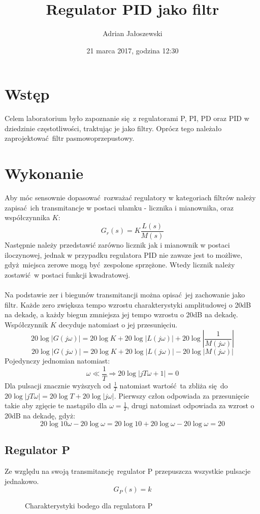 \documentclass[a4paper, 10pt]{article}
\title{Regulator PID jako filtr}
\author{Adrian Jałoszewski}
\date{21 marca 2017, godzina 12:30}
\begin{document}
	\lstset{language=Python, basicstyle=\footnotesize,
		keepspaces=true,frame=single,tabsize=4}
	\maketitle
	\section{Wstęp}
		Celem laboratorium było zapoznanie się z regulatorami P, PI, PD oraz PID w dziedzinie częstotliwości, traktując je jako filtry. Oprócz tego należało zaprojektować filtr pasmowoprzepustowy.
	\section{Wykonanie}
		Aby móc sensownie dopasować rozważać regulatory w kategoriach filtrów należy zapisać ich transmitancje w postaci ułamku - licznika i mianownika, oraz współczynnika $K$:
		$$
			G_r(s) = K\frac{L(s)}{M(s)}
		$$
		Następnie należy przedstawić zarówno licznik jak i mianownik w postaci iloczynowej, jednak w przypadku regulatora PID nie zawsze jest to możliwe, gdyż miejsca zerowe mogą być zespolone sprzężone. Wtedy licznik należy zostawić w postaci funkcji kwadratowej. 
		\\
		\\
		Na podstawie zer i biegunów transmitancji można opisać jej zachowanie jako filtr. Każde zero zwiększa tempo wzrostu charakterystyki amplitudowej o 20dB na dekadę, a każdy biegun zmniejsza jej tempo wzrostu o 20dB na dekadę. Współczynnik $K$ decyduje natomiast o jej przesunięciu.
		$$
			20 \log |G(j\omega)| = 20 \log K + 20 \log |L(j\omega)| + 20 \log \left|\frac{1}{M(j\omega)}\right|
		$$
		$$
			20 \log |G(j\omega)| =  20 \log K + 20 \log |L(j\omega)| - 20 \log \left|M(j\omega)\right|
		$$ 
		Pojedynczy jednomian natomiast:
		$$
			\omega \ll \frac{1}{T} \Rightarrow 20 \log |jT\omega + 1| = 0 
		$$
		Dla pulsacji znacznie wyższych od $\frac{1}{T}$ natomiast wartość ta zbliża się do \linebreak $20 \log |jT\omega| = 20\log T + 20 \log |j\omega|$. Pierwszy człon odpowiada za przesunięcie takie aby zgięcie te nastąpiło dla $\omega = \frac{1}{T}$, drugi natomiast odpowiada za wzrost o 20dB na dekadę, gdyż: 
		$$
			20\log 10\omega - 20\log \omega = 20 \log 10 + 20 \log \omega - 20 \log \omega = 20
		$$
		\newpage
		\subsection{Regulator P}
			Ze względu na swoją transmitancję regulator P przepuszcza wszystkie pulsacje jednakowo.
			$$
				G_P(s) = k
			$$
			\begin{figure}[H]
				\centering
				\def \svgwidth{0.7\columnwidth}
				
				\caption{Charakterystyki bodego dla regulatora P}
			\end{figure}\noindent
\end{document}
